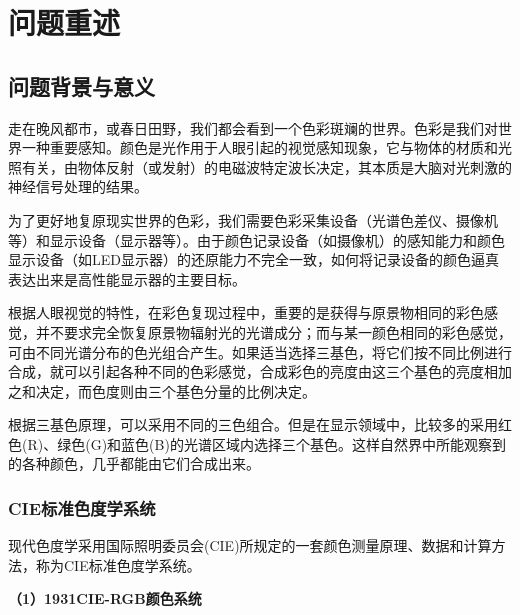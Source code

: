 \chapter[\hspace{0pt}问题重述]{{\heiti{}\hspace{0pt}问题重述}}\label{chapter1: 问题重述}

\removelofgap
\removelotgap

\section[\hspace{-2pt}问题背景与意义]{{\heiti{} \hspace{-8pt}问题背景与意义}}\label{section1: 问题背景与意义}

走在晚风都市，或春日田野，我们都会看到一个色彩斑斓的世界。色彩是我们对世界一种重要感知。颜色是光作用于人眼引起的视觉感知现象，它与物体的材质和光照有关，由物体反射（或发射）的电磁波特定波长决定，其本质是大脑对光刺激的神经信号处理的结果。

为了更好地复原现实世界的色彩，我们需要色彩采集设备（光谱色差仪、摄像机等）和显示设备（显示器等）。由于颜色记录设备（如摄像机）的感知能力和颜色显示设备（如LED显示器）的还原能力不完全一致，如何将记录设备的颜色逼真表达出来是高性能显示器的主要目标。

根据人眼视觉的特性，在彩色复现过程中，重要的是获得与原景物相同的彩色感觉，并不要求完全恢复原景物辐射光的光谱成分；而与某一颜色相同的彩色感觉，可由不同光谱分布的色光组合产生。如果适当选择三基色，将它们按不同比例进行合成，就可以引起各种不同的色彩感觉，合成彩色的亮度由这三个基色的亮度相加之和决定，而色度则由三个基色分量的比例决定。

根据三基色原理，可以采用不同的三色组合。但是在显示领域中，比较多的采用红色(R)、绿色(G)和蓝色(B)的光谱区域内选择三个基色。这样自然界中所能观察到的各种颜色，几乎都能由它们合成出来。

\subsection[\hspace{-2pt}CIE标准色度学系统]{{\heiti{} \hspace{-8pt}CIE标准色度学系统}}\label{subsection1: CIE标准色度学系统}

现代色度学采用国际照明委员会(CIE)所规定的一套颜色测量原理、数据和计算方法，称为CIE标准色度学系统。

\noindent\textbf{（1）1931CIE-RGB颜色系统}

